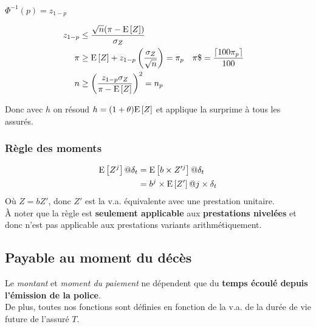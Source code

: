 \documentclass[10pt, french]{article}
\begin{document}
\begin{multicols*}{3}

$\Phi^{-1}(p) = z_{1 - p}$

\begin{align*}
	z_{1 - p} &\le \frac{\sqrt{n} ( \pi - \mathrm{E} \left[ Z \right])}{\sigma_{Z}}\\
	\pi &\ge \mathrm{E} \left[ Z \right] + z_{1 - p} \left(\frac{\sigma_{Z}}{\sqrt{n}}\right) = \pi_p &
	\pi\$ &= \frac{\lceil 100 \pi_p \rceil}{100} \\
	n &\ge \left(\frac{z_{1 - p}\sigma_{Z}}{\pi - \mathrm{E} \left[ Z \right]}\right)^2 = n_{p} 
\end{align*} 

Donc avec $h$ on résoud $h = (1 + \theta) \mathrm{E} \left[ Z \right]$ et applique la surprime à tous les assurés.


\subsubsection*{Règle des moments}

\begin{align*}
	\mathrm{E} \left[ Z^{j} \right]@\delta_{t} &= \mathrm{E} \left[ b \times Z'^{j} \right]@\delta_{t} \\
	&= b^{j} \times \mathrm{E} \left[ Z' \right]@ j \times \delta_{t}
\end{align*}
Où $Z = bZ'$, donc $Z'$ est la v.a. équivalente avec une prestation unitaire.\\
À noter que la règle est \textbf{seulement applicable} aux \textbf{prestations nivelées} et donc n'est pas applicable aux prestations variants arithmétiquement.


\subsection{Payable au moment du décès}

Le \textit{montant} et \textit{moment du paiement} ne dépendent que du \textbf{temps écoulé depuis l'émission de la police}.\\
De plus, toutes nos fonctions sont définies en fonction de la v.a. de la durée de vie future de l'assuré $T$.


\end{multicols*}
\end{document}
